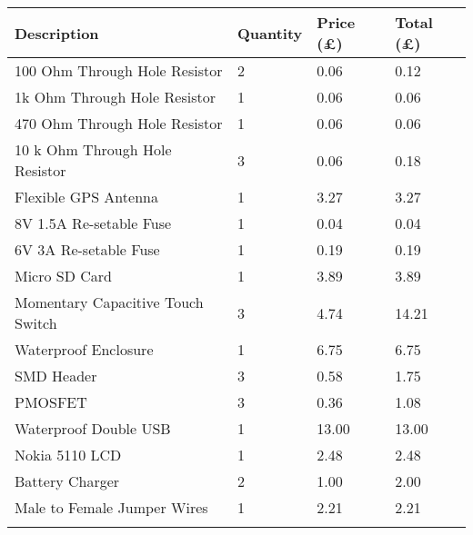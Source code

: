 \begin{table}
\centering
\begin{tabular}{|l|l|l|l|}
\hline
\textbf{Description} & \textbf{Quantity} & \textbf{Price (£)} & \textbf{Total (£)} \\ \hline
\rowcolor[HTML]{adffca} 
100 Ohm Through Hole Resistor      & 2        & 0.06      & 0.12      \\ \hline
\rowcolor[HTML]{adffca} 
1k Ohm Through Hole Resistor       & 1        & 0.06      & 0.06      \\ \hline
\rowcolor[HTML]{adffca} 
470 Ohm Through Hole Resistor      & 1        & 0.06      & 0.06      \\ \hline
\rowcolor[HTML]{adffca} 
10 k Ohm Through Hole Resistor     & 3        & 0.06      & 0.18      \\ \hline
\rowcolor[HTML]{adffca} 
Flexible GPS Antenna               & 1        & 3.27      & 3.27      \\ \hline
\rowcolor[HTML]{adffca} 
8V 1.5A Re-setable Fuse            & 1        & 0.04      & 0.04      \\ \hline
\rowcolor[HTML]{adffca} 
6V 3A Re-setable  Fuse             & 1        & 0.19      & 0.19      \\ \hline
\rowcolor[HTML]{ffd49c} 
Micro SD Card                      & 1        & 3.89      & 3.89      \\ \hline
\rowcolor[HTML]{ffd49c} 
Momentary Capacitive  Touch Switch & 3        & 4.74      & 14.21     \\ \hline
\rowcolor[HTML]{adffca} 
Waterproof Enclosure               & 1        & 6.75      & 6.75      \\ \hline
\rowcolor[HTML]{adffca} 
SMD Header                         & 3        & 0.58      & 1.75      \\ \hline
\rowcolor[HTML]{adffca} 
PMOSFET                            & 3        & 0.36      & 1.08      \\ \hline
\rowcolor[HTML]{ff8585} 
Waterproof Double \gls{USB}              & 1        & 13.00     & 13.00     \\ \hline
\rowcolor[HTML]{ffd49c} 
Nokia 5110 LCD                     & 1        & 2.48      & 2.48      \\ \hline
\rowcolor[HTML]{ffd49c} 
Battery Charger                    & 2        & 1.00      & 2.00      \\ \hline
\rowcolor[HTML]{ff8585} 
Male to Female Jumper Wires        & 1        & 2.21      & 2.21      \\ \hline
\rowcolor[HTML]{ffd49c} 

\end{tabular}
\end{table}
